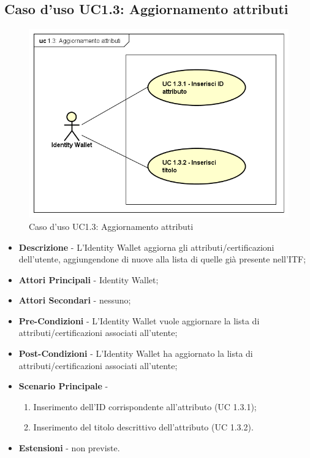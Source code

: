 \subsection{Caso d'uso UC1.3: Aggiornamento attributi}
\begin{figure}[h]
	\centering
	\includegraphics[scale=0.50]{immagini/usecase/UC13_AggiornamentoAttributi}
	\caption{Caso d'uso UC1.3: Aggiornamento attributi}
\end{figure}
\begin{itemize}
	\item \textbf{Descrizione} - L'Identity Wallet aggiorna gli attributi/certificazioni dell'utente, aggiungendone di nuove alla lista di quelle già presente nell'\gls{ITF};
	\item \textbf{Attori Principali} - Identity Wallet;
	\item \textbf{Attori Secondari} - nessuno;
	\item \textbf{Pre-Condizioni} - L'Identity Wallet vuole aggiornare la lista di attributi/certificazioni associati all'utente;
	\item \textbf{Post-Condizioni} - L'Identity Wallet ha aggiornato la lista di attributi/certificazioni associati all'utente;
	\item \textbf{Scenario Principale} -
	\begin{enumerate}
		\item Inserimento dell'ID corrispondente all'attributo (UC 1.3.1);
		\item Inserimento del titolo descrittivo dell'attributo (UC 1.3.2).
	\end{enumerate}
	\item \textbf{Estensioni} - non previste.
\end{itemize}
